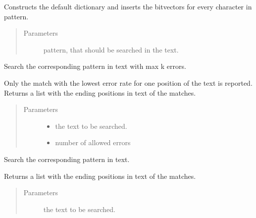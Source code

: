\documentclass[letterpaper,10pt,english]{sphinxmanual}
\begin{document}
\begin{fulllineitems}
\begin{fulllineitems}
Constructs the default dictionary  and inserts the
bitvectors for every character in pattern.
\begin{quote}\begin{description}
\item[{Parameters}] \leavevmode
{} \textendash{} pattern, that should be searched in the text.

\end{description}\end{quote}

\end{fulllineitems}


\begin{fulllineitems}
\label{\detokenize{api:approx_str_matching.Matcher.match_approx}}
Search the corresponding pattern in text with max k errors.

Only the match with the lowest error rate for one position of
the text is reported. Returns a list with the ending positions
in text of the matches.
\begin{quote}\begin{description}
\item[{Parameters}] \leavevmode\begin{itemize}
\item {} 
 \textendash{} the text to be searched.

\item {} 
 \textendash{} number of allowed errors

\end{itemize}

\end{description}\end{quote}

\end{fulllineitems}


\begin{fulllineitems}
\label{\detokenize{api:approx_str_matching.Matcher.match_exact}}
Search the corresponding pattern in text.

Returns a list with the ending positions in text of the
matches.
\begin{quote}\begin{description}
\item[{Parameters}] \leavevmode
{} \textendash{} the text to be searched.

\end{description}\end{quote}

\end{fulllineitems}


\end{fulllineitems}
\end{document}
